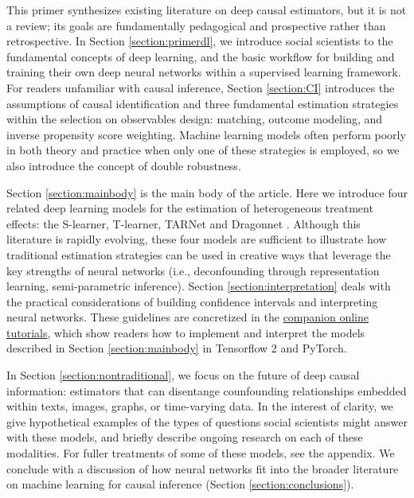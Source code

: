 This primer synthesizes existing literature on deep causal estimators, but it is not a review; its goals are fundamentally pedagogical and prospective rather than retrospective. In Section \ref{section:primerdl}, we introduce social scientists to the fundamental concepts of deep learning, and the basic workflow for building and training their own deep neural networks within a supervised learning framework. For readers unfamiliar with causal inference, Section \ref{section:CI} introduces the assumptions of causal identification and three fundamental estimation strategies within the selection on observables design: matching, outcome modeling, and inverse propensity score weighting. Machine learning models often perform poorly in both theory and practice when only one of these strategies is employed, so we also introduce the concept of double robustness.

Section \ref{section:mainbody} is the main body of the article. Here we introduce four related deep learning models for the estimation of heterogeneous treatment effects: the S-learner, T-learner, TARNet and Dragonnet \citep{Shalit2017,Shi2019}. Although this literature is rapidly evolving, these four models are sufficient to illustrate how traditional estimation strategies can be used in creative ways that leverage the key strengths of neural networks (i.e., deconfounding through representation learning, semi-parametric inference). Section \ref{section:interpretation} deals with the practical considerations of building confidence intervals and interpreting neural networks. These guidelines are concretized in the \href{https://github.com/kochbj/Deep-Learning-for-Causal-Inference}{companion online tutorials}, which show readers how to implement and interpret the models described in Section \ref{section:mainbody} in Tensorflow 2 and PyTorch.

In Section \ref{section:nontraditional}, we focus on the future of deep causal information: estimators that can disentange counfounding relationships embedded within texts, images, graphs, or time-varying data. In the interest of clarity, we give hypothetical examples of the types of questions social scientists might answer with these models, and briefly describe ongoing research on each of these modalities. For fuller treatments of some of these models, see the appendix. We conclude with a discussion of how neural networks fit into the broader literature on machine learning for causal inference (Section \ref{section:conclusions}).

